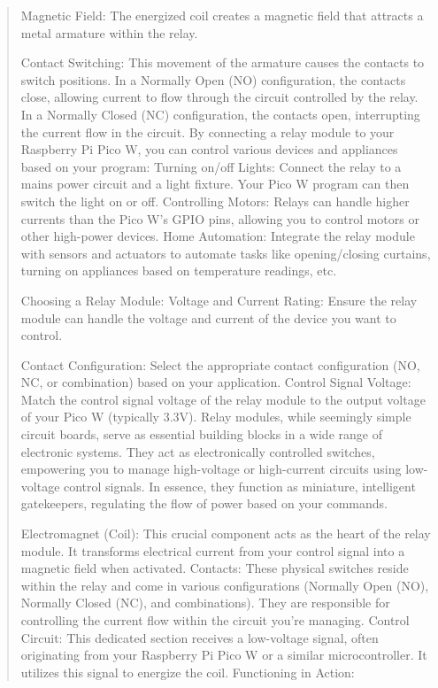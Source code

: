 \documentclass[12pt]{report}
\begin{document}
\begin{quote}
				Magnetic Field: The energized coil creates a magnetic field that attracts a metal armature within the relay.
				
				Contact Switching: This movement of the armature causes the contacts to switch positions.
				In a Normally Open (NO) configuration, the contacts close, allowing current to flow through the circuit controlled by the relay. In a Normally Closed (NC) configuration, the contacts open, interrupting the current flow in the circuit. By connecting a relay module to your Raspberry Pi Pico W, you can control various devices and appliances based on your program:
				Turning on/off Lights: Connect the relay to a mains power circuit and a light fixture. Your Pico W program can then switch the light on or off.
				Controlling Motors: Relays can handle higher currents than the Pico W's GPIO pins, allowing you to control motors or other high-power devices.
				Home Automation: Integrate the relay module with sensors and actuators to automate tasks like opening/closing curtains, turning on appliances based on temperature readings, etc.
				
				Choosing a Relay Module:
				Voltage and Current Rating: Ensure the relay module can handle the voltage and current of the device you want to control.
				
				Contact Configuration: Select the appropriate contact configuration (NO, NC, or combination) based on your application.
				Control Signal Voltage: Match the control signal voltage of the relay module to the output voltage of your Pico W (typically 3.3V).
				Relay modules, while seemingly simple circuit boards, serve as essential building blocks in a wide range of electronic systems. They act as electronically controlled switches, empowering you to manage high-voltage or high-current circuits using low-voltage control signals. In essence, they function as miniature, intelligent gatekeepers, regulating the flow of power based on your commands.
				
				Electromagnet (Coil): This crucial component acts as the heart of the relay module. It transforms electrical current from your control signal into a magnetic field when activated.
				Contacts: These physical switches reside within the relay and come in various configurations (Normally Open (NO), Normally Closed (NC), and combinations). They are responsible for controlling the current flow within the circuit you're managing.
				Control Circuit: This dedicated section receives a low-voltage signal, often originating from your Raspberry Pi Pico W or a similar microcontroller. It utilizes this signal to energize the coil.
				Functioning in Action:
				

\end{quote}
\end{document}
